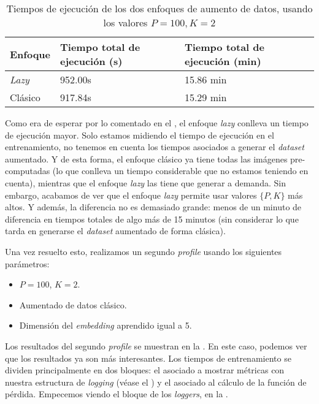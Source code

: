 \begin{table}[!hbtp]
	\centering
	\begin{tabular}{|l|l|l|}
		\hline
		\textbf{Enfoque} & \textbf{Tiempo total de ejecución (s)} & \textbf{Tiempo total de ejecución (min)} \\
		\hline

		\textit{Lazy}    & 952.00s                                & 15.86 min                                \\
		Clásico          & 917.84s                                & 15.29 min                                \\

		\hline
	\end{tabular}
	\caption{Tiempos de ejecución de los dos enfoques de aumento de datos, usando los valores $P = 100, K = 2$}
	\label{table:optimizacion_01}
\end{table}

Como era de esperar por lo comentado en el , el enfoque \textit{lazy} conlleva un tiempo de ejecución mayor. Solo estamos midiendo el tiempo de ejecución en el entrenamiento, no tenemos en cuenta los tiempos asociados a generar el \textit{dataset} aumentado. Y de esta forma, el enfoque clásico ya tiene todas las imágenes pre-computadas (lo que conlleva un tiempo considerable que no estamos teniendo en cuenta), mientras que el enfoque \textit{lazy} las tiene que generar a demanda. Sin embargo, acabamos de ver que el enfoque \textit{lazy} permite usar valores $\{P, K\}$ más altos. Y además, la diferencia no es demasiado grande: menos de un minuto de diferencia en tiempos totales de algo más de 15 minutos (sin considerar lo que tarda en generarse el \textit{dataset} aumentado de forma clásica).

Una vez resuelto esto, realizamos un segundo \textit{profile} usando los siguientes parámetros:

\begin{itemize}
	\item $P = 100$, $K = 2$.
	\item Aumentado de datos clásico.
	\item Dimensión del \textit{embedding} aprendido igual a 5.
\end{itemize}

Los resultados del segundo \textit{profile} se muestran en la . En este caso, podemos ver que los resultados ya son más interesantes. Los tiempos de entrenamiento se dividen principalmente en dos bloques: el asociado a mostrar métricas con nuestra estructura de \textit{logging} (véase el ) y el asociado al cálculo de la función de pérdida. Empecemos viendo el bloque de los \textit{loggers}, en la .

